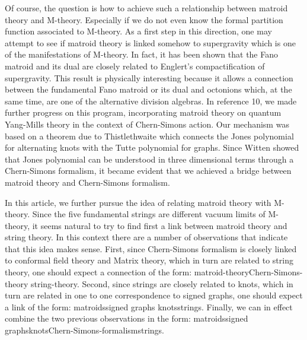 \documentclass[a4paper,12pt]{article}
\begin{document}
Of course, the question is how to achieve such a relationship between
matroid theory and M-theory. Especially if we do not even know the formal
partition function associated to M-theory. As a first step in this
direction, one may attempt to see if matroid theory is linked somehow to \coordHE{} supergravity which is one of the manifestations of M-theory. In fact,
it has been shown\coordHE{} that the Fano matroid and its dual are closely
related to Englert's compactification\coordHE{} of \coordHE{} supergravity. This
result is physically interesting because it allows a connection between the
fundamental Fano matroid or its dual\coordHE{} and octonions which, at the same
time, are one of the alternative division algebras.\coordHE{} In reference 10,
we made further progress on this program, incorporating matroid theory on
quantum Yang-Mills theory in the context of Chern-Simons action. Our
mechanism was based on a theorem due to Thistlethwaite\coordHE{} which connects
the Jones polynomial for alternating knots with the Tutte polynomial for
graphs. Since Witten\coordHE{} showed that Jones polynomial can be understood
in three dimensional terms through a Chern-Simons formalism, it became
evident that we achieved a bridge between matroid theory and Chern-Simons
formalism.

In this article, we further pursue the idea of relating matroid theory with
M-theory. Since the five fundamental strings are different vacuum limits of
M-theory, it seems natural to try to find first a link between matroid
theory and string theory. In this context there are a number of observations
that indicate that this idea makes sense. First, since Chern-Simons
formalism is closely linked to conformal field theory and Matrix theory,
which in turn are related to string theory, one should expect a connection
of the form: matroid-theory\myHighlight{$\rightarrow $}\coordHE{}Chern-Simons-theory\myHighlight{$\rightarrow $}\coordHE{}%
string-theory. Second, since strings are closely related to knots, which in
turn are related in one to one correspondence to signed graphs, one should
expect a link of the form: matroids\myHighlight{$\rightarrow $}\coordHE{}signed graphs\myHighlight{$\rightarrow $}\coordHE{}%
knots\myHighlight{$\rightarrow $}\coordHE{}strings. Finally, we can in effect combine the two
previous observations in the form: matroids\myHighlight{$\rightarrow $}\coordHE{}signed graphs\myHighlight{$%
\rightarrow $}\coordHE{}knots\myHighlight{$\rightarrow $}\coordHE{}Chern-Simons-formalism\myHighlight{$\rightarrow $}\coordHE{}strings.
\end{document}
